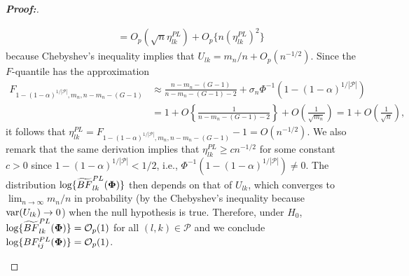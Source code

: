 \documentclass[times,sort&compress,3p]{elsarticle}
\theoremstyle{plain}%
\theoremstyle{definition}
\def\log{\hbox{log}}
\def\var{\hbox{var}}
\def\log{\hbox{log}}
\def\var{\hbox{var}}
\newcommand{\uPhi}              {\mbox{\boldmath$\Phi$}}
\newcommand{\rsz}[1]{\textcolor{red}{#1}}
\begin{document}
\begin{proof}[\textbf{\upshape Proof:}]
\begin{description}
{\begin{align*}
    &\quad = O_p(\sqrt{n}\eta_{lk}^{PL}) + O_p\{n(\eta_{lk}^{PL})^2\}
\end{align*}
because Chebyshev's inequality implies that $U_{lk} = m_n/n + O_p(n^{-1/2})$. Since the $F$-quantile has the approximation
\begin{align*}
F_{1 - (1 - \alpha)^{1/|\mathcal{P}|}, m_n, n - m_n - (G - 1)} 
&\approx \frac{n - m_n - (G - 1)}{n - m_n - (G - 1) - 2} + \sigma_n\Phi^{-1}(1 - (1 - \alpha)^{1/|\mathcal{P}|})\\
& = 1 + O\left\{\frac{1}{n - m_n - (G - 1) - 2}\right\} + O\left(\frac{1}{\sqrt{m_n}}\right) = 1 + O\left(\frac{1}{\sqrt{n}}\right),
\end{align*}
it follows that $\eta_{lk}^{PL} = F_{1 - (1 - \alpha)^{1/|\mathcal{P}|}, m_n, n - m_n - (G - 1)} - 1 = O(n^{-1/2})$. We also remark that the same derivation implies that $\eta_{lk}^{PL}\geq cn^{-1/2}$ for some constant $c > 0$ since $1 - (1 - \alpha)^{1/|\mathcal{P}|} < 1/2$, i.e., $\Phi^{-1}(1 - (1 - \alpha)^{1/|\mathcal{P}|})\neq 0$. 
}
The distribution $ \log\{\widetilde{BF}^{PL}_{lk}(\uPhi) \}$ then depends on that of $U_{lk}$, which
converges to $\lim_{n\to\infty}m_n/n$ in probability (by the Chebyshev's inequality because $\var(U_{lk})\to 0$)
when the null hypothesis is true.
Therefore, under $H_0$, $\log\{\widetilde{BF}^{PL}_{lk}(\uPhi) \} = \mathcal{O}_{p}(1)$ for all $(l, k)\in\mathcal{P}$ and we conclude $\log\{BF^{PL}_{ij}(\uPhi) \} = \mathcal{O}_{p}(1)$.


\end{description}
\end{proof}
\end{document}
